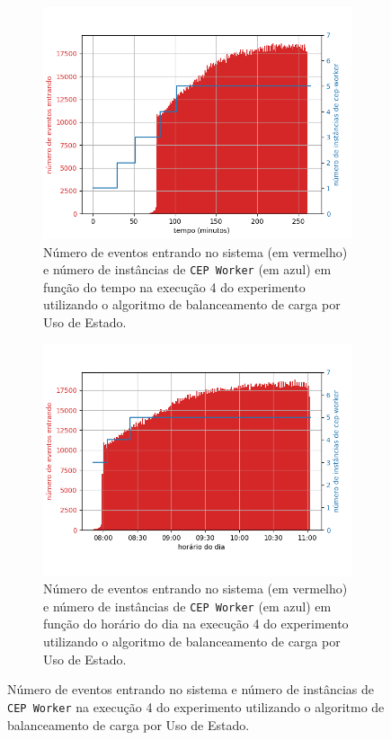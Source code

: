 \begin{figure}[h]
\centering
\begin{subfigure}{0.9\textwidth}
\centering
\includegraphics[width=\textwidth]{figuras/graphics/carga_e_workers_total9-dez-su.png}
\caption{Número de eventos entrando no sistema (em vermelho) e número de instâncias de \texttt{CEP Worker} (em azul) em função do tempo na execução 4 do experimento utilizando o algoritmo de balanceamento de carga por Uso de Estado.}
\label{fig:workers_and_load_total_9-dez-su}
\end{subfigure}%

\begin{subfigure}{\textwidth}
\centering
\includegraphics[width=\textwidth]{figuras/graphics/carga_e_workers_horario9-dez-su.png}
\caption{Número de eventos entrando no sistema (em vermelho) e número de instâncias de \texttt{CEP Worker} (em azul) em função do horário do dia na execução 4 do experimento utilizando o algoritmo de balanceamento de carga por Uso de Estado.}
\label{fig:workers_and_load_SPtrans_9-dez-su}
\end{subfigure}%
\caption{Número de eventos entrando no sistema e número de instâncias de \texttt{CEP Worker} na execução 4 do experimento utilizando o algoritmo de balanceamento de carga por Uso de Estado.}
\end{figure}

